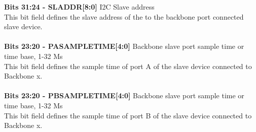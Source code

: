 \textbf{Bits 31:24 - SLADDR[8:0]} I2C Slave address\\
This bit field defines the slave address of the to the backbone port connected slave device.\\\\
\textbf{Bits 23:20 - PASAMPLETIME[4:0]} Backbone slave port sample time or time base, 1-32 Ms\\
This bit field defines the sample time of port A of the slave device connected to Backbone x.\\\\
\textbf{Bits 23:20 - PBSAMPLETIME[4:0]} Backbone slave port sample time or time base, 1-32 Ms\\
This bit field defines the sample time of port B of the slave device connected to Backbone x.\\\\

